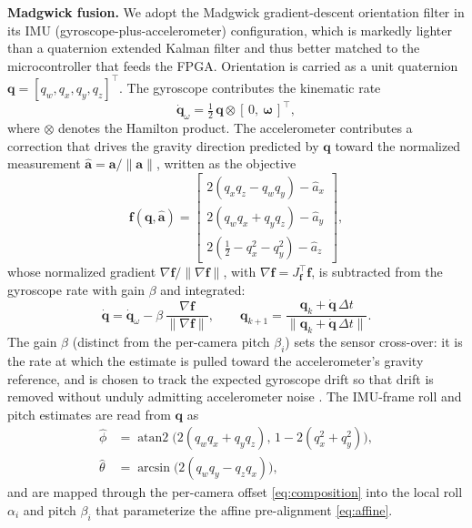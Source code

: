 \documentclass[journal]{IEEEtran}
\begin{document}
\textbf{Madgwick fusion.} We adopt the Madgwick gradient-descent orientation filter \cite{madgwick2010filter} in its IMU (gyroscope-plus-accelerometer) configuration, which is markedly lighter than a quaternion extended Kalman filter \cite{sabatini2006ekf,valenti2015quaternion} and thus better matched to the microcontroller that feeds the FPGA. Orientation is carried as a unit quaternion $\mathbf{q}=[q_w,q_x,q_y,q_z]^\top$. The gyroscope contributes the kinematic rate
\begin{equation}
\dot{\mathbf q}_\omega = \tfrac12\,\mathbf q \otimes [\,0,\ \boldsymbol\omega\,]^\top ,
\label{eq:qdotgyro}
\end{equation}
where $\otimes$ denotes the Hamilton product. The accelerometer contributes a correction that drives the gravity direction predicted by $\mathbf q$ toward the normalized measurement $\hat{\mathbf a}=\mathbf a/\lVert\mathbf a\rVert$, written as the objective
\begin{equation}
\mathbf f(\mathbf q,\hat{\mathbf a}) =
\begin{bmatrix}
2(q_xq_z-q_wq_y)-\hat a_x\\[1pt]
2(q_wq_x+q_yq_z)-\hat a_y\\[1pt]
2(\tfrac12-q_x^2-q_y^2)-\hat a_z
\end{bmatrix},
\label{eq:madobj}
\end{equation}
whose normalized gradient $\nabla\mathbf f/\lVert\nabla\mathbf f\rVert$, with $\nabla\mathbf f = J_{\mathbf f}^\top\mathbf f$, is subtracted from the gyroscope rate with gain $\beta$ and integrated:
\begin{equation}
\dot{\mathbf q} = \dot{\mathbf q}_\omega - \beta\,\frac{\nabla\mathbf f}{\lVert\nabla\mathbf f\rVert},\qquad
\mathbf q_{k+1}=\frac{\mathbf q_k+\dot{\mathbf q}\,\Delta t}{\big\lVert\mathbf q_k+\dot{\mathbf q}\,\Delta t\big\rVert}.
\label{eq:madupdate}
\end{equation}
The gain $\beta$ (distinct from the per-camera pitch $\beta_i$) sets the sensor cross-over: it is the rate at which the estimate is pulled toward the accelerometer's gravity reference, and is chosen to track the expected gyroscope drift so that drift is removed without unduly admitting accelerometer noise \cite{madgwick2010filter}. The IMU-frame roll and pitch estimates are read from $\mathbf q$ as
\begin{align}
\hat\phi &= \operatorname{atan2}\!\big(2(q_wq_x+q_yq_z),\,1-2(q_x^2+q_y^2)\big),\label{eq:quatroll}\\
\hat\theta &= \arcsin\!\big(2(q_wq_y-q_zq_x)\big),\label{eq:quatpitch}
\end{align}
and are mapped through the per-camera offset \eqref{eq:composition} into the local roll $\alpha_i$ and pitch $\beta_i$ that parameterize the affine pre-alignment \eqref{eq:affine}.
\end{document}
